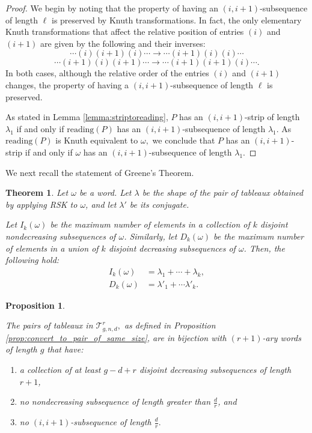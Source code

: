 \documentclass[12pt]{amsart}
\def\cT{\mathcal{T}}
\newtheorem{theorem}[definition]{Theorem}
\newtheorem{proposition}[definition]{Proposition}
\begin{document}
\begin{proof}
We begin by noting that the property of having an $(i,i+1)$-subsequence of length $\ell$ is preserved by Knuth transformations. In fact, the only elementary Knuth transformations that affect the relative position of entries $(i)$ and $(i+1)$ are given by the following  and their inverses: \[\cdots (i)(i+1)(i)\cdots\rightarrow \cdots (i+1)(i)(i)\cdots\] \[\cdots(i+1)(i)(i+1)\cdots\rightarrow \cdots(i+1)(i+1)(i)\cdots.\] In both cases, although the relative order of the entries $(i)$ and $(i+1)$ changes, the property of having a $(i,i+1)$-subsequence of length $\ell$ is preserved. 

As stated in Lemma \ref{lemma:striptoreading}, $P$ has an $(i,i+1)$-strip of length $\lambda_1$ if and only if $\text{reading}(P)$ has an $(i,i+1)$-subsequence of length $\lambda_1.$ As $\text{reading}(P)$ is Knuth equivalent to $\omega,$ we conclude that $P$ has an $(i,i+1)$-strip if and only if $\omega$ has an $(i,i+1)$-subsequence of length $\lambda_1.$
\end{proof}

We next recall the statement of Greene's Theorem.

\begin{theorem}\cite[Theorem 4.8.10]{sagan}
\label{Greenestheorem}
Let $\omega$ be a word. Let $\lambda$ be the shape of the pair of tableaux obtained by applying RSK to $\omega$, and let $\lambda'$ be its conjugate.

Let $I_k(\omega)$ be the maximum number of elements in a collection of $k$ disjoint nondecreasing subsequences of $\omega$. Similarly, let $D_{k}(\omega)$ be the maximum number of elements in a union of $k$ disjoint decreasing subsequences of $\omega$.
Then, the following hold:
\begin{align*}
I_k(\omega)&=\lambda_1 + \cdots + \lambda_k,\\
D_{k}(\omega)&=\lambda'_1+\cdots \lambda'_{k}.
\end{align*}
\end{theorem}



\begin{proposition}\label{prop:calTtosequences}

The pairs of tableaux in $\cT_{g,n,d}^r,$ as defined in Proposition \ref{prop:convert_to_pair_of_same_size}, are in bijection with $(r+1)$-ary words of length $g$ that have:

\begin{enumerate}
\item[(i)] a collection of at least $g-d+r$ disjoint decreasing subsequences of length $r+1$,
\item[(ii)] no nondecreasing subsequence of length greater than $\frac{d}{r}$, and
\item[(iii)] no $(i,i+1)$-subsequence of length $\frac{d}{r}.$ 
\end{enumerate}

\end{proposition}
\end{document}

